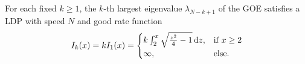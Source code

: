 \begin{theorem}\label{thm:A1}
	For each fixed $k\geq 1$, the $k$-th largest eigenvalue $\lambda_{N-k+1}$ of the GOE satisfies a LDP with speed $N$ and good rate function
	$$I_k(x)=kI_1(x)=\begin{cases}
						k\int_2^x\sqrt{\frac{z^2}{4}-1}\mathop{}\!\mathrm{d} z, &\mbox{if } x\geq 2 \\
						\infty, &\mbox{else.}
					  \end{cases}$$
\end{theorem}

